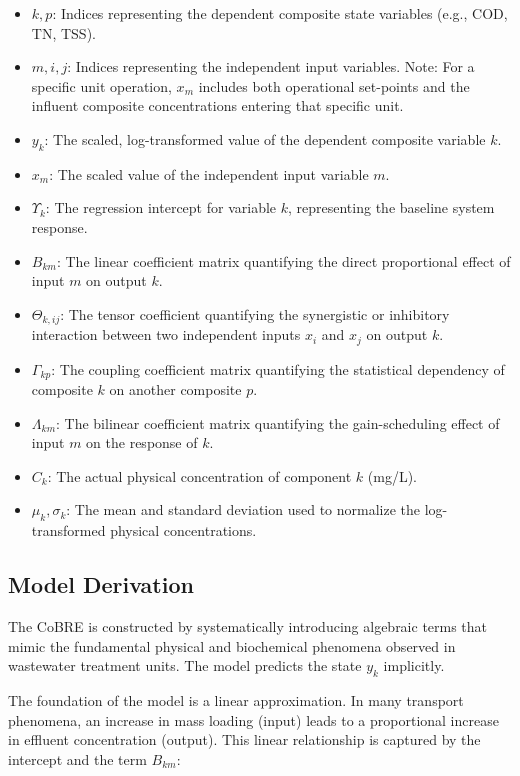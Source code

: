 \documentclass{article}
\begin{document}
\begin{itemize}
    \item $k, p$: Indices representing the dependent composite state variables (e.g., COD, TN, TSS).
    \item $m, i, j$: Indices representing the independent input variables. Note: For a specific unit operation, $x_{m}$ includes both operational set-points and the influent composite concentrations entering that specific unit.
    \item $y_{k}$: The scaled, log-transformed value of the dependent composite variable $k$.
    \item $x_{m}$: The scaled value of the independent input variable $m$.
    \item $\Upsilon_{k}$: The regression intercept for variable $k$, representing the baseline system response.
    \item $B_{km}$: The linear coefficient matrix quantifying the direct proportional effect of input $m$ on output $k$.
    \item $\Theta_{k,ij}$: The tensor coefficient quantifying the synergistic or inhibitory interaction between two independent inputs $x_{i}$ and $x_{j}$ on output $k$.
    \item $\Gamma_{kp}$: The coupling coefficient matrix quantifying the statistical dependency of composite $k$ on another composite $p$.
    \item $\Lambda_{km}$: The bilinear coefficient matrix quantifying the gain-scheduling effect of input $m$ on the response of $k$.
    \item $C_{k}$: The actual physical concentration of component $k$ (mg/L).
    \item $\mu_{k}, \sigma_{k}$: The mean and standard deviation used to normalize the log-transformed physical concentrations.
\end{itemize}

\subsection{Model Derivation}
The CoBRE is constructed by systematically introducing algebraic terms that mimic the fundamental physical and biochemical phenomena observed in wastewater treatment units. The model predicts the state $y_{k}$ implicitly.

The foundation of the model is a linear approximation. In many transport phenomena, an increase in mass loading (input) leads to a proportional increase in effluent concentration (output). This linear relationship is captured by the intercept and the term $B_{km}$:
\end{document}

